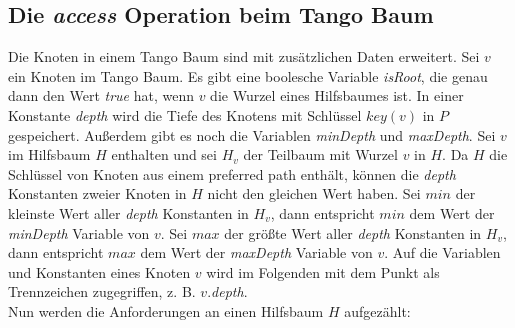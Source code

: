 \documentclass[a4paper,12pt]{article}
\begin{document}
\subsection{Die \textit{access} Operation beim Tango Baum}
Die Knoten in einem Tango Baum sind mit zusätzlichen Daten erweitert. Sei $v$ ein Knoten im Tango Baum. Es gibt eine boolesche Variable \textit{isRoot}, die genau dann den Wert \textit{true} hat, wenn $v$ die Wurzel eines Hilfsbaumes ist. In einer Konstante \textit{depth} wird die Tiefe des Knotens mit Schlüssel $\mathit{key}\left(v\right)$ in $P$ gespeichert. Außerdem gibt es noch die Variablen \textit{minDepth} und \textit{maxDepth}. Sei $v$ im Hilfsbaum $H$ enthalten und sei $H_v$ der Teilbaum mit Wurzel $v$ in $H$. Da $H$ die Schlüssel von Knoten aus einem preferred path enthält, können die \textit{depth} Konstanten zweier Knoten in $H$ nicht den gleichen Wert haben. Sei $\mathit{min}$ der kleinste Wert aller \textit{depth} Konstanten in $H_v$, dann entspricht $\mathit{min}$ dem  Wert der \textit{minDepth} Variable von $v$. Sei $\mathit{max}$ der größte Wert aller \textit{depth} Konstanten in $H_v$, dann entspricht $\mathit{max}$ dem  Wert der \textit{maxDepth} Variable von $v$. Auf die Variablen und Konstanten eines Knoten $v$ wird im Folgenden mit dem Punkt als Trennzeichen zugegriffen, z. B. $v$.\textit{depth}. \\
Nun werden die Anforderungen an einen Hilfsbaum $H$ aufgezählt:
\end{document}
